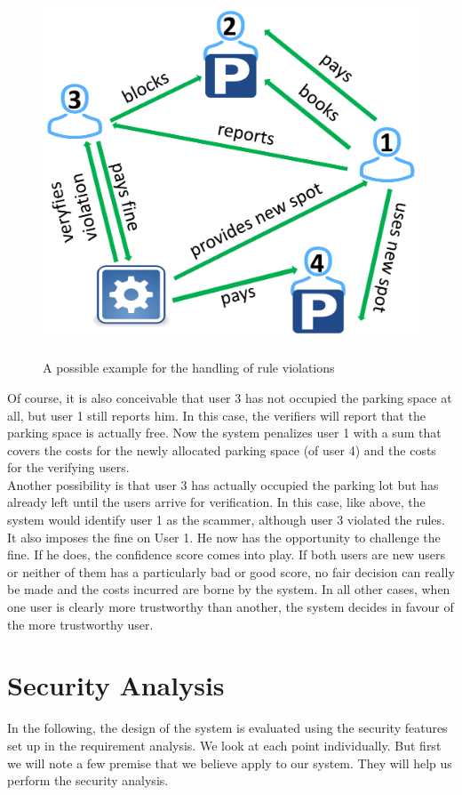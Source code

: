 \documentclass[
a4paper,     %
titlepage,   %
14pt         %
]{scrartcl}  %
\theoremstyle{mystyle}
\begin{document}
\begin{figure}
	\centering
	\includegraphics[width=13cm,height=11cm]{example_grafik.pdf}
	\caption{A possible example for the handling of rule violations}
	\label{img:example-grafik}
\end{figure}
 
Of course, it is also conceivable that user 3 has not occupied the parking space at all, but user 1 still reports him. In this case, the verifiers will report that the parking space is actually free. Now the system penalizes user 1 with a sum that covers the costs for the newly allocated parking space (of user 4) and the costs for the verifying users.\\

Another possibility is that user 3 has actually occupied the parking lot but has already left until the users arrive for verification. In this case, like above, the system would identify user 1 as the scammer, although user 3 violated the rules. It also imposes the fine on User 1. He now has the opportunity to challenge the fine. If he does, the confidence score comes into play. If both users are new users or neither of them has a particularly bad or good score, no fair decision can really be made and the costs incurred are borne by the system. In all other cases, when one user is clearly more trustworthy than another, the system decides in favour of the more trustworthy user.


\section{Security Analysis}
In the following, the design of the system is evaluated using the security features set up in the requirement analysis. We look at each point individually. But first we will note a few premise that we believe apply to our system. They will help us perform the security analysis.
\end{document}
